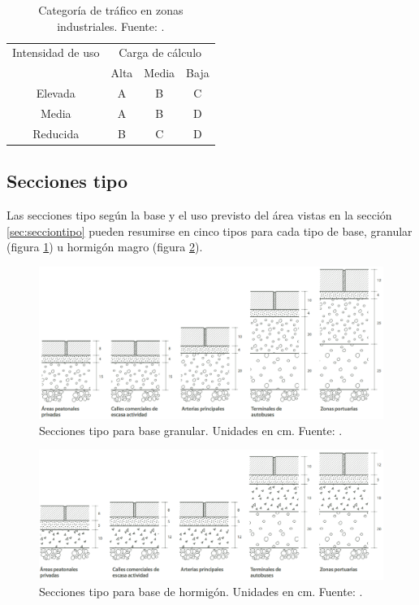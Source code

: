 \begin{table}[!htb]
\centering
\begin{tabular}{cccc}
\toprule
Intensidad de uso & \multicolumn{3}{c}{Carga de cálculo}\\
\cmidrule{2-4}
& Alta & Media & Baja\\
\midrule
Elevada & A & B & C\\
Media & A & B & D\\
Reducida & B & C & D\\
\bottomrule
\end{tabular}
\caption[Categoría de tráfico en zonas industriales.]{Categoría de tráfico en zonas industriales. Fuente: \protect\cite{euroadoquinc}.}
\label{categoriadetraficoenzonasindustriales}
\end{table}

\subsection{Secciones tipo}

Las secciones tipo según la base y el uso previsto del área vistas en la sección \ref{sec:secciontipo} pueden resumirse en cinco tipos para cada tipo de base, granular (figura \ref{fig:seccionestipogranular}) u hormigón magro (figura \ref{fig:seccionestipohormigon}).

\begin{figure}[!htb]
\centering
\includegraphics[width=15cm]{img/seccionestipo_1.png}
\caption[Secciones tipo para base granular.]{Secciones tipo para base granular. Unidades en cm. Fuente: \cite{fenollar}.}
\label{fig:seccionestipogranular}
\end{figure}

\begin{figure}[!htb]
\centering
\includegraphics[width=15cm]{img/seccionestipo_2.png}
\caption[Secciones tipo para base de hormigón.]{Secciones tipo para base de hormigón. Unidades en cm. Fuente: \cite{fenollar}.}
\label{fig:seccionestipohormigon}
\end{figure}

